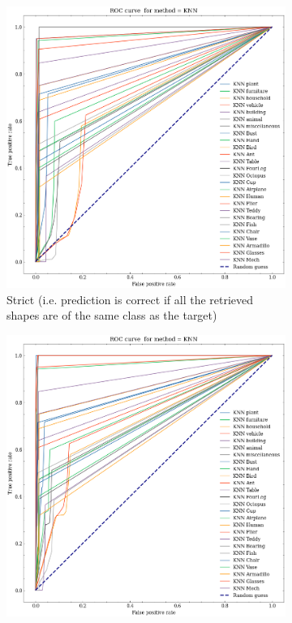 \begin{figure}
    \centering
        \begin{subfigure}[b]{0.45\textwidth}
            \includegraphics[width=\textwidth]{assets/evaluation_results/KNN/roc_curve_KNN_strict.png}
            \caption{Strict (i.e. prediction is correct if all the retrieved shapes are of the same class as the target)}
        \end{subfigure}
        \hfill
        \begin{subfigure}[b]{0.45\textwidth}
            \includegraphics[width=\textwidth]{assets/evaluation_results/KNN/roc_curve_KNN_relaxed.png}

\end{subfigure}
\end{figure}
